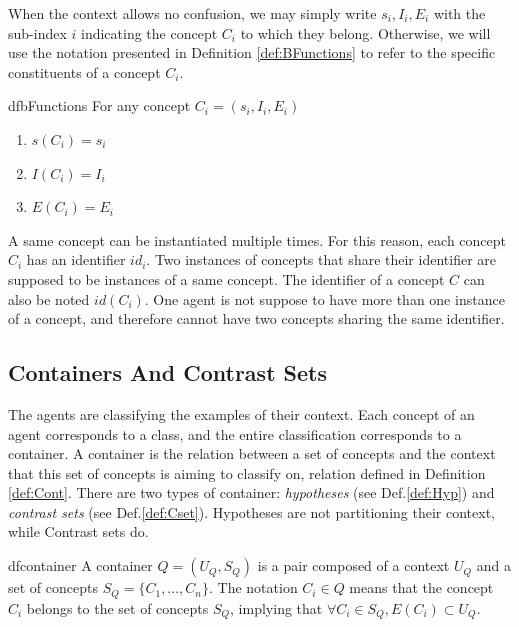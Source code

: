 When the context allows no confusion, we may simply write $s_{i}, I_{i}, E_{i}$ with the sub-index $i$ indicating the concept $C_{i}$ to which they belong. Otherwise, we will use the notation presented in Definition \ref{def:BFunctions} to refer to the specific constituents of a concept $C_{i}$.

\begin{restatable}{df}{bFunctions}
\label{def:BFunctions}
For any concept $C_{i} = (s_{i}, I_{i}, E_{i})$

\begin{enumerate}
\item $s(C_{i}) = s_{i}$
\item $I(C_{i}) = I_{i}$
\item $E(C_{i}) = E_{i}$
\end{enumerate}

\end{restatable}

A same concept can be instantiated multiple times. For this reason, each concept $C_{i}$ has an identifier $id_{i}$. Two instances of concepts that share their identifier are supposed to be instances of a same concept. The identifier of a concept $C$ can also be noted $id(C_{i})$. One agent is not suppose to have more than one instance of a concept, and therefore cannot have two concepts sharing the same identifier.


\subsection{Containers And Contrast Sets}
\label{sec:Containers}

The agents are classifying the examples of their context. Each concept of an agent corresponds to a class, and the entire classification corresponds to a container. A container is the relation between a set of concepts and the context that this set of concepts is aiming to classify on, relation defined in Definition \ref{def:Cont}. There are two types of container: \emph{hypotheses} (see Def.\ref{def:Hyp}) and \emph{contrast sets} (see Def.\ref{def:Cset}). Hypotheses are not partitioning their context, while Contrast sets do.

\begin{restatable}[Container]{df}{container}
\label{def:Cont}
A container $Q = (U_{Q}, S_{Q})$ is a pair composed of a context $U_{Q}$ and a set of concepts $S_{Q} = \{ C_{1}, \ldots ,C_{n} \}$. The notation $C_i \in Q$ means that the concept $C_i$ belongs to the set of concepts $S_{Q}$, implying that $\forall C_{i} \in S_{Q}, E(C_i) \subset U_{Q}$.
\end{restatable}

